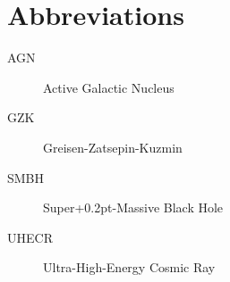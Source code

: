 \chapter*{Abbreviations}
\label{ch:abbreviations}

\begin{description}
	\item[AGN] Active Galactic Nucleus
	\item[GZK] Greisen-Zatsepin-Kuzmin
	\item[SMBH] Super{\kern+0.2pt}-Massive Black Hole
	\item[UHECR] Ultra-High-Energy Cosmic Ray
\end{description}
